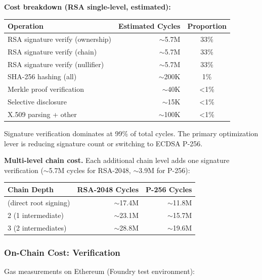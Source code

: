 \documentclass[11pt, a4paper]{article}
\begin{document}
\textbf{Cost breakdown (RSA single-level, estimated):}

\begin{longtable}[]{@{}lrc@{}}
\toprule\noalign{}
Operation & Estimated Cycles & Proportion \\
\midrule\noalign{}
\endhead
\bottomrule\noalign{}
\endlastfoot
RSA signature verify (ownership) & $\sim$5.7M & 33\% \\
RSA signature verify (chain) & $\sim$5.7M & 33\% \\
RSA signature verify (nullifier) & $\sim$5.7M & 33\% \\
SHA-256 hashing (all) & $\sim$200K & 1\% \\
Merkle proof verification & $\sim$40K & \textless1\% \\
Selective disclosure & $\sim$15K & \textless1\% \\
X.509 parsing + other & $\sim$100K & \textless1\% \\
\end{longtable}

Signature verification dominates at 99\% of total cycles. The primary
optimization lever is reducing signature count or switching to ECDSA
P-256.

\textbf{Multi-level chain cost.} Each additional chain level adds one
signature verification ($\sim$5.7M cycles for RSA-2048,
$\sim$3.9M for P-256):

\begin{longtable}[]{@{}lrr@{}}
\toprule\noalign{}
Chain Depth & RSA-2048 Cycles & P-256 Cycles \\
\midrule\noalign{}
\endhead
\bottomrule\noalign{}
\endlastfoot
1 (direct root signing) & $\sim$17.4M & $\sim$11.8M \\
2 (1 intermediate) & $\sim$23.1M & $\sim$15.7M \\
3 (2 intermediates) & $\sim$28.8M & $\sim$19.6M \\
\end{longtable}

\subsubsection{On-Chain Cost:
Verification}\label{on-chain-cost-verification}

Gas measurements on Ethereum (Foundry test environment):
\end{document}
